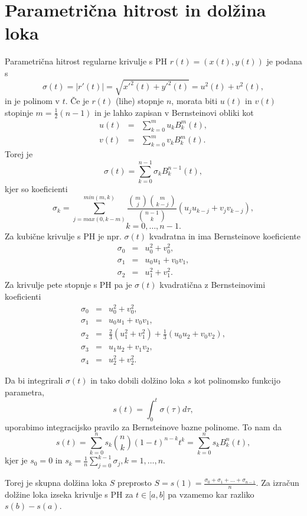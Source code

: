 \documentclass[a4paper]{IEEEtran}
\begin{document}
	\section{Parametrična hitrost in dolžina loka}
	Parametrična hitrost regularne krivulje s PH $r (t) = (x (t), y (t))$ je podana s 
	$$\sigma (t) = | r\prime (t) | =\sqrt{x\prime^2(t)+y\prime^2(t)}= u^2 (t) + v^2 (t),$$
	in je polinom v $t$. Če je $r (t)$ (lihe) stopnje $n$, morata biti $u (t)$ in $v (t)$ stopinje $m = \frac{1}{2}(n - 1)$ in je lahko zapisan v Bernsteinovi obliki kot
	\begin{eqnarray}
	u (t) &=&\sum_{k=0}^m u_kB_k^m(t),\nonumber\\
	v (t)&=&\sum_{k=0}^m v_kB_k^m(t).\nonumber
	\end{eqnarray}
	Torej je
	$$\sigma (t) =\sum_{k=0}^{n-1} \sigma_kB_k^{n-1}(t),$$
	kjer so koeficienti 
	$$\sigma_k =\sum_{j=max(0,k-m)}^{min(m,k)}\frac{\binom{m}{j}\binom{m}{k-j}}{\binom{n-1}{k}}(u_ju_{k-j}+v_jv_{k-j}),$$ $$k = 0,\ldots , n - 1.$$
	Za kubične krivulje s PH je npr. $\sigma (t)$ kvadratna in ima Bernsteinove koeficiente
	\begin{eqnarray}
	\sigma_0 &=& u^2_0+ v^2_0, \nonumber\\
	\sigma_1 &=& u_0u_1 + v_0v_1, \nonumber\\
	\sigma_2 &=& u^2_1+ v^2_1.\nonumber
	\end{eqnarray}
	Za krivulje pete stopnje s PH pa je $\sigma(t)$ kvadratična z Bernsteinovimi koeficienti
	\begin{eqnarray}
	\sigma_0&=&u_0^2+v_0^2,\nonumber\\
	\sigma_1&=&u_0u_1+v_0v_1,\nonumber\\
	\sigma_2&=&\frac{2}{3}(u_1^2+v_1^2)+\frac{1}{3}(u_0u_2+v_0v_2),\nonumber\\
	\sigma_3&=&u_1u_2+v_1v_2,\nonumber\\
	\sigma_4&=&u_2^2+v_2^2.\nonumber
	\end{eqnarray}
	
	Da bi integrirali $\sigma (t)$ in tako dobili dolžino loka $s$ kot polinomsko funkcijo parametra,
	$$s (t) =\int^t_0\sigma(\tau) d\tau,$$
	uporabimo integracijsko pravilo za Bernsteinove bazne polinome. To nam da
	$$s (t) =\sum^n_{k=0}s_k\binom{n}{k}(1-t)^{n-k}t^k=\sum_{k=0}^n s_kB^n_k(t),$$
	kjer je $s_0=0$ in $s_k=\frac{1}{n}\sum^{k-1}_{j=0}\sigma_j, k=1,\ldots,n.$
	
	Torej je skupna dolžina loka $S$ preprosto
	$S = s (1) = \frac{\sigma_0+\sigma_1+\ldots+\sigma_{n-1}}{n}.$
	Za izračun dolžine loka izseka krivulje s PH za $t\in\lbrack a, b\rbrack$ pa vzamemo kar razliko $s (b) -s (a)$.
	
\end{document}
